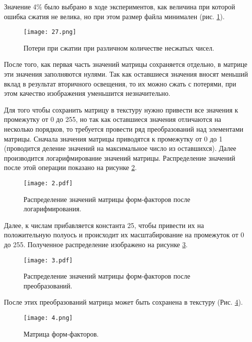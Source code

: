 \documentclass[12pt,fleqn]{article}
\begin{document}
Значение 4\% было выбрано в ходе экспериментов, как величина при которой ошибка сжатия не велика, но при этом размер файла минимален (рис. \ref{part_error}).

\begin{figure}[htb]
    \centering
    \texttt{[image: 27.png]}
    \caption{Потери при сжатии при различном количестве несжатых чисел.}
    \label{part_error}
\end{figure}

После того, как первая часть значений матрицы сохраняется отдельно, в матрице эти значения заполняются нулями. Так как оставшиеся значения вносят меньший вклад в результат вторичного освещения, то их можно сжать с потерями, при этом качество изображения уменьшится незначительно.

Для того чтобы сохранить матрицу в текстуру нужно привести все значения к промежутку от 0 до 255, но так как оставшиеся значения отличаются на несколько порядков, то требуется провести ряд преобразований над элементами матрицы. Сначала значения матрицы приводятся к промежутку от 0 до 1 (проводится деление значений на максимальное число из оставшихся). Далее производится логарифмирование значений матрицы. Распределение значений после этой операции показано на рисунке \ref{log_distribution}.

\begin{figure}[htb]
    \centering
    \texttt{[image: 2.pdf]}
    \caption{Распределение значений матрицы форм-факторов после логарифмирования.}
    \label{log_distribution}
\end{figure}

Далее, к числам прибавляется константа 25, чтобы привести их на положительную полуось и происходит их масштабирование на промежуток от 0 до 255. Полученное распределение изображено на рисунке \ref{result_distribution}.

\begin{figure}[htb]
    \centering
    \texttt{[image: 3.pdf]}
    \caption{Распределение значений матрицы форм-факторов после преобразований.}
    \label{result_distribution}
\end{figure}

После этих преобразований матрица может быть сохранена в текстуру (Рис. \ref{ff_matrix}).

\pagebreak

\begin{figure}[htb]
    \centering
    \texttt{[image: 4.png]}
    \caption{Матрица форм-факторов.}
    \label{ff_matrix}
\end{figure}
\end{document}
